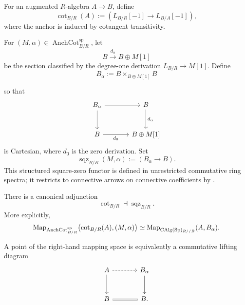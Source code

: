 \begin{definition}
\label{def:cotangent-square-zero-functors}
For an augmented \(R\)-algebra \(A\to B\), define
\[
    \operatorname{cot}_{B/R}(A)
    :=
    \left(
        L_{B/R}[-1]
        \longrightarrow
        L_{B/A}[-1]
    \right),
\]
where the anchor is induced by cotangent transitivity.

For \((M,\alpha)\in\operatorname{AnchCot}^{\mathrm{sp}}_{B/R}\), let
\[
    B\xrightarrow{d_\alpha}B\oplus M[1]
\]
be the section classified by the degree-one derivation
\(L_{B/R}\to M[1]\). Define
\[
    B_\alpha:=B\times_{B\oplus M[1]}B
\]

so that
\[
\begin{tikzcd}[column sep=large,row sep=large]
    B_\alpha \arrow[r] \arrow[d]
        & B \arrow[d,"d_\alpha"]
    \\
    B \arrow[r,"d_0"']
        & B\oplus M[1]
\end{tikzcd}
\]
is Cartesian, where \(d_0\) is the zero derivation. Set
\[
    \operatorname{sqz}_{B/R}(M,\alpha)
    :=
    (B_\alpha\to B).
\]
This structured square-zero functor is defined in unrestricted commutative ring spectra;
it restricts to connective arrows on connective coefficients by
.
\end{definition}

\begin{proposition}
\label{prop:cotangent-square-zero-adjunction}
There is a canonical adjunction
\[
    \operatorname{cot}_{B/R}
    \dashv
    \operatorname{sqz}_{B/R}.
\]
More explicitly,
\[
\operatorname{Map}_{\operatorname{AnchCot}^{\mathrm{sp}}_{B/R}}
\bigl(
    \operatorname{cot}_{B/R}(A),(M,\alpha)
\bigr)
\simeq
\operatorname{Map}_{\operatorname{CAlg}(\operatorname{Sp})_{R//B}}
(A,B_\alpha).
\]

A point of the right-hand mapping space is equivalently a commutative lifting
diagram
\[
\begin{tikzcd}[column sep=large,row sep=large]
    A \arrow[r,dashed] \arrow[d]
        & B_\alpha \arrow[d]
    \\
    B \arrow[r,equal]
        & B .
\end{tikzcd}
\]
\end{proposition}

